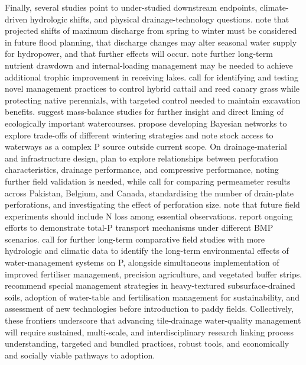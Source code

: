 Finally, several studies point to under-studied downstream endpoints, climate-driven hydrologic shifts, and physical drainage-technology questions. \textcite{Apsite2017} note that projected shifts of maximum discharge from spring to winter must be considered in future flood planning, that discharge changes may alter seasonal water supply for hydropower, and that further effects will occur. \textcite{Husk2024} note further long-term nutrient drawdown and internal-loading management may be needed to achieve additional trophic improvement in receiving lakes. \textcite{Winikoff2020} call for identifying and testing novel management practices to control hybrid cattail and reed canary grass while protecting native perennials, with targeted control needed to maintain excavation benefits. \textcite{PALKO1994} suggest mass-balance studies for further insight and direct liming of ecologically important watercourses. \textcite{Lucci2014} propose developing Bayesian networks to explore trade-offs of different wintering strategies and note stock access to waterways as a complex P source outside current scope. On drainage-material and infrastructure design, \textcite{Zhang2025b} plan to explore relationships between perforation characteristics, drainage performance, and compressive performance, noting further field validation is needed, while \textcite{ASGHAR1995} call for comparing permeameter results across Pakistan, Belgium, and Canada, standardising the number of drain-plate perforations, and investigating the effect of perforation size. \textcite{Zhang2022b} note that future field experiments should include N loss among essential observations. \textcite{Eastman2010} report ongoing efforts to demonstrate total-P transport mechanisms under different BMP scenarios. \textcite{Grenon2023} call for further long-term comparative field studies with more hydrologic and climatic data to identify the long-term environmental effects of water-management systems on P, alongside simultaneous implementation of improved fertiliser management, precision agriculture, and vegetated buffer strips. \textcite{Hashemi2020} recommend special management strategies in heavy-textured subsurface-drained soils, adoption of water-table and fertilisation management for sustainability, and assessment of new technologies before introduction to paddy fields. Collectively, these frontiers underscore that advancing tile-drainage water-quality management will require sustained, multi-scale, and interdisciplinary research linking process understanding, targeted and bundled practices, robust tools, and economically and socially viable pathways to adoption.